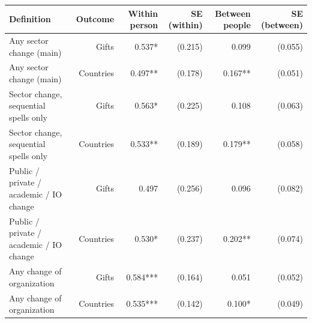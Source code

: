 \begin{tabular}{lrrrrr}
\toprule
Definition & Outcome & Within person & SE (within) & Between people & SE (between) \\
\midrule
Any sector change (main) & Gifts & 0.537* & (0.215) & 0.099 & (0.055) \\
Any sector change (main) & Countries & 0.497** & (0.178) & 0.167** & (0.051) \\
Sector change, sequential spells only & Gifts & 0.563* & (0.225) & 0.108 & (0.063) \\
Sector change, sequential spells only & Countries & 0.533** & (0.189) & 0.179** & (0.058) \\
Public / private / academic / IO change & Gifts & 0.497 & (0.256) & 0.096 & (0.082) \\
Public / private / academic / IO change & Countries & 0.530* & (0.237) & 0.202** & (0.074) \\
Any change of organization & Gifts & 0.584*** & (0.164) & 0.051 & (0.052) \\
Any change of organization & Countries & 0.535*** & (0.142) & 0.100* & (0.049) \\
\bottomrule
\end{tabular}
\par{}
